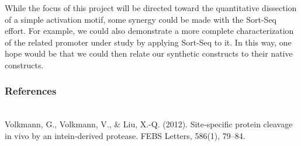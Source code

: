 \documentclass[12pt]{article}
\begin{document}
%
%
%
%
%
%


While the focus of this project will be directed toward the quantitative
dissection of a simple activation motif, some synergy could be made with the
Sort-Seq effort. For example, we could also demonstrate a more complete
characterization of the related promoter under study by applying Sort-Seq to it.
In this way, one hope would be that we could then relate our synthetic
constructs to their native constructs.

\subsubsection*{References} \\

\noindent Volkmann, G., Volkmann, V., & Liu, X.-Q. (2012). Site‐specific protein cleavage
in vivo by an intein‐derived protease. FEBS Letters, 586(1), 79–84.


\newpage
\end{document}
